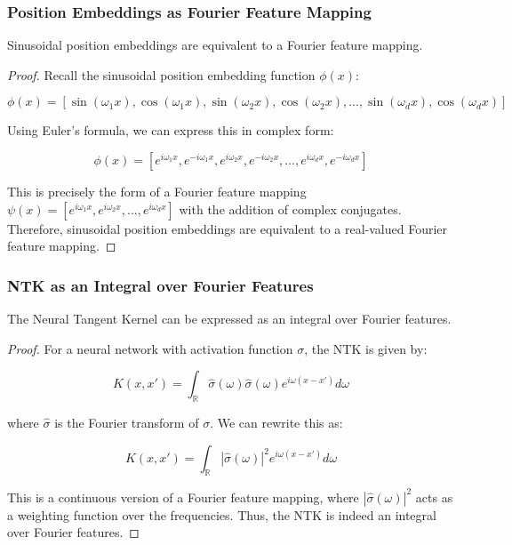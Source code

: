 \documentclass{article}
\begin{document}
\subsubsection{Position Embeddings as Fourier Feature Mapping}

\begin{theorem}
Sinusoidal position embeddings are equivalent to a Fourier feature mapping.
\end{theorem}

\begin{proof}
Recall the sinusoidal position embedding function $\phi(x)$:

\begin{equation}
    \phi(x) = [\sin(\omega_1 x), \cos(\omega_1 x), \sin(\omega_2 x), \cos(\omega_2 x), ..., \sin(\omega_d x), \cos(\omega_d x)]
\end{equation}

Using Euler's formula, we can express this in complex form:

\begin{equation}
    \phi(x) = [e^{i\omega_1 x}, e^{-i\omega_1 x}, e^{i\omega_2 x}, e^{-i\omega_2 x}, ..., e^{i\omega_d x}, e^{-i\omega_d x}]
\end{equation}

This is precisely the form of a Fourier feature mapping $\psi(x) = [e^{i\omega_1 x}, e^{i\omega_2 x}, ..., e^{i\omega_d x}]$ with the addition of complex conjugates. Therefore, sinusoidal position embeddings are equivalent to a real-valued Fourier feature mapping.
\end{proof}

\subsubsection{NTK as an Integral over Fourier Features}

\begin{theorem}
The Neural Tangent Kernel can be expressed as an integral over Fourier features.
\end{theorem}

\begin{proof}
For a neural network with activation function $\sigma$, the NTK is given by:

\begin{equation}
    K(x, x') = \int_{\mathbb{R}} \hat{\sigma}(\omega) \hat{\sigma}(\omega) e^{i\omega(x-x')} d\omega
\end{equation}

where $\hat{\sigma}$ is the Fourier transform of $\sigma$. We can rewrite this as:

\begin{equation}
    K(x, x') = \int_{\mathbb{R}} |\hat{\sigma}(\omega)|^2 e^{i\omega(x-x')} d\omega
\end{equation}

This is a continuous version of a Fourier feature mapping, where $|\hat{\sigma}(\omega)|^2$ acts as a weighting function over the frequencies. Thus, the NTK is indeed an integral over Fourier features.
\end{proof}
\end{document}
